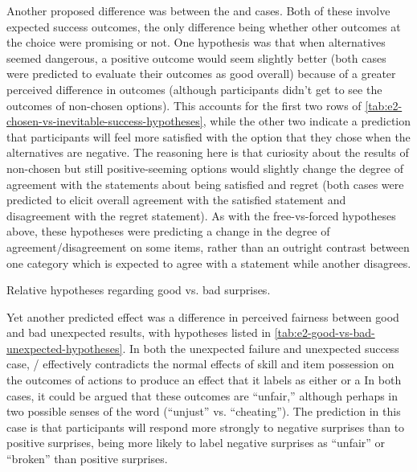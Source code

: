 Another proposed difference was between the \exps{} and \obvsm{} cases.
%
Both of these involve expected success outcomes, the only difference being whether other outcomes at the choice were promising or not.
%
One hypothesis was that when alternatives seemed dangerous, a positive outcome would seem slightly better (both cases were predicted to evaluate their outcomes as good overall) because of a greater perceived difference in outcomes (although participants didn't get to see the outcomes of non-chosen options).
%
This accounts for the first two rows of \cref{tab:e2-chosen-vs-inevitable-success-hypotheses}, while the other two indicate a prediction that participants will feel more satisfied with the option that they chose when the alternatives are negative.
%
The reasoning here is that curiosity about the results of non-chosen but still positive-seeming options would slightly change the degree of agreement with the statements about being satisfied and regret (both cases were predicted to elicit overall agreement with the satisfied statement and disagreement with the regret statement).
%
As with the free-vs-forced hypotheses above, these hypotheses were predicting a change in the degree of agreement/disagreement on some items, rather than an outright contrast between one category which is expected to agree with a statement while another disagrees.


\begin{table}[!h]
\centering
\bgroup
\def\arraystretch{1.3}
\setlength{\tabcolsep}{0.6em}

\egroup
\caption[Retrospective good vs. bad unexpected hypotheses]{Relative hypotheses regarding good vs. bad surprises.}
\label{tab:e2-good-vs-bad-unexpected-hypotheses}
\end{table}


Yet another predicted effect was a difference in perceived fairness between good and bad unexpected results, with hypotheses listed in \cref{tab:e2-good-vs-bad-unexpected-hypotheses}.
%
In both the unexpected failure and unexpected success case, \dunyazad/ effectively contradicts the normal effects of skill and item possession on the outcomes of actions to produce an effect that it labels as either  or a 
%
In both cases, it could be argued that these outcomes are ``unfair,'' although perhaps in two possible senses of the word (``unjust'' vs. ``cheating'').
%
The prediction in this case is that participants will respond more strongly to negative surprises than to positive surprises, being more likely to label negative surprises as ``unfair'' or ``broken'' than positive surprises.


